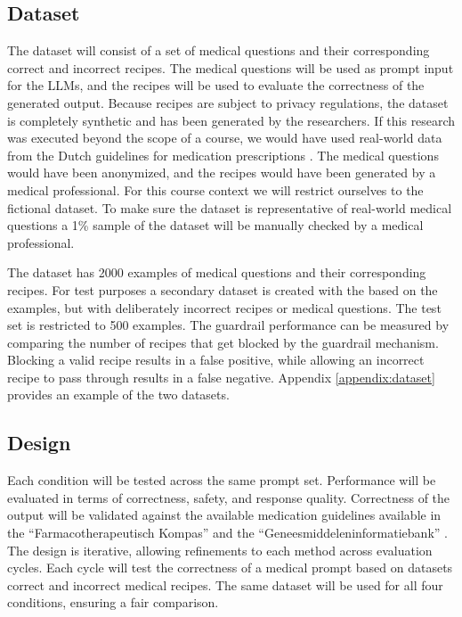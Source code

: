 \subsection{Dataset}

The dataset will consist of a set of medical questions and their corresponding correct and incorrect recipes.
The medical questions will be used as prompt input for the LLMs, and the recipes will be used to evaluate the correctness of the generated output.
Because recipes are subject to privacy regulations, the dataset is completely synthetic and has been generated by the researchers.
If this research was executed beyond the scope of a course, we would have used real-world data from the Dutch guidelines for medication prescriptions \citep{farmacotherapeutischkompas}.
The medical questions would have been anonymized, and the recipes would have been generated by a medical professional.
For this course context we will restrict ourselves to the fictional dataset.
To make sure the dataset is representative of real-world medical questions a 1\% sample of the dataset will be manually checked by a medical professional.

The dataset has 2000 examples of medical questions and their corresponding recipes.
For test purposes a secondary dataset is created with the based on the examples, but with deliberately incorrect recipes or medical questions.
The test set is restricted to 500 examples.
The guardrail performance can be measured by comparing the number of recipes that get blocked by the guardrail mechanism.
Blocking a valid recipe results in a false positive, while allowing an incorrect recipe to pass through results in a false negative.
Appendix \ref{appendix:dataset} provides an example of the two datasets.

\subsection{Design}

Each condition will be tested across the same prompt set.
Performance will be evaluated in terms of correctness, safety, and response quality.
Correctness of the output will be validated against the available medication guidelines available in the ``Farmacotherapeutisch Kompas'' \citep{farmacotherapeutischkompas} and the ``Geneesmiddeleninformatiebank'' \citep{geneesmiddeleninformatiebank}.
The design is iterative, allowing refinements to each method across evaluation cycles.
Each cycle will test the correctness of a medical prompt based on datasets correct and incorrect medical recipes.
The same dataset will be used for all four conditions, ensuring a fair comparison.


